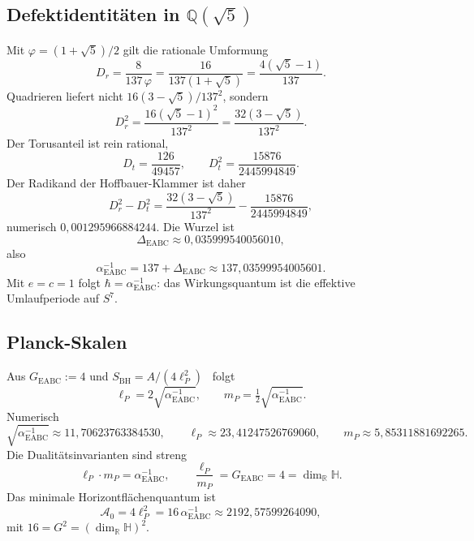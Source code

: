 \documentclass[11pt,a4paper]{article}
\begin{document}
\subsection{Defektidentitäten in $\mathbb{Q}(\sqrt{5})$}
Mit $\varphi=(1+\sqrt{5})/2$ gilt die rationale Umformung
\begin{equation}
\label{eq:Dr}
D_r=\frac{8}{137\,\varphi}=\frac{16}{137(1+\sqrt{5})}=\frac{4(\sqrt{5}-1)}{137}.
\end{equation}
Quadrieren liefert nicht $16(3-\sqrt{5})/137^2$, sondern
\begin{equation}
\label{eq:Drsq}
D_r^2=\frac{16(\sqrt{5}-1)^2}{137^2}=\frac{32(3-\sqrt{5})}{137^2}.
\end{equation}
Der Torusanteil ist rein rational,
\begin{equation}
D_t=\frac{126}{49457},\qquad
D_t^2=\frac{15876}{2445994849}.
\end{equation}
Der Radikand der Hoffbauer-Klammer ist daher
\begin{equation}
\label{eq:rad}
D_r^2-D_t^2
=\frac{32(3-\sqrt{5})}{137^2}-\frac{15876}{2445994849},
\end{equation}
numerisch $0{,}001295966884244$.
Die Wurzel ist
\begin{equation}
\Delta_{\mathrm{EABC}}\approx 0{,}035999540056010,
\end{equation}
also
\begin{equation}
\alpha^{-1}_{\mathrm{EABC}}=137+\Delta_{\mathrm{EABC}}\approx 137{,}03599954005601.
\end{equation}
Mit $e=c=1$ folgt $\hbar=\alpha^{-1}_{\mathrm{EABC}}$: das Wirkungsquantum ist die effektive Umlaufperiode auf $S^7$.

\subsection{Planck-Skalen}
Aus $G_{\mathrm{EABC}}:=4$ und $S_{\mathrm{BH}}=A/(4\ell_P^2)$~\cite{bekenstein1973,hawking1975} folgt
\begin{equation}
\label{eq:planck}
\ell_P=2\sqrt{\alpha^{-1}_{\mathrm{EABC}}},\qquad
m_P=\tfrac12\sqrt{\alpha^{-1}_{\mathrm{EABC}}}.
\end{equation}
Numerisch
\begin{equation}
\sqrt{\alpha^{-1}_{\mathrm{EABC}}}\approx 11{,}70623763384530,\qquad
\ell_P\approx 23{,}41247526769060,\qquad
m_P\approx 5{,}85311881692265.
\end{equation}
Die Dualitätsinvarianten sind streng
\begin{equation}
\ell_P\cdot m_P=\alpha^{-1}_{\mathrm{EABC}},\qquad
\frac{\ell_P}{m_P}=G_{\mathrm{EABC}}=4=\dim_{\mathbb{R}}\mathbb{H}.
\end{equation}
Das minimale Horizontflächenquantum ist
\begin{equation}
\mathcal{A}_0=4\ell_P^2=16\,\alpha^{-1}_{\mathrm{EABC}}\approx 2192{,}57599264090,
\end{equation}
mit $16=G^2=(\dim_{\mathbb{R}}\mathbb{H})^2$.
\end{document}

